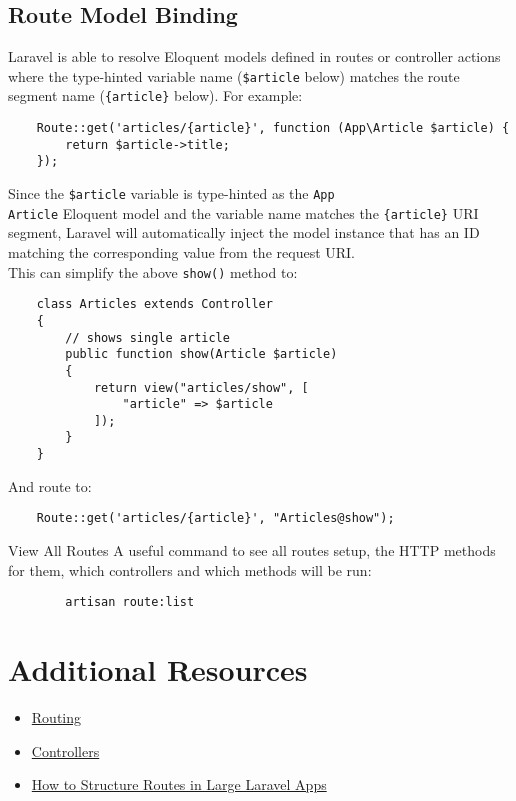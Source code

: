 \subsection{Route Model Binding}

Laravel is able to resolve Eloquent models defined in routes or controller actions where the type-hinted variable name (\texttt{\$article} below) matches the route segment name (\texttt{\{article\}} below). For example:

\begin{verbatim}
    Route::get('articles/{article}', function (App\Article $article) {
        return $article->title;
    });
\end{verbatim}

Since the \texttt{\$article} variable is type-hinted as the \texttt{App\\Article} Eloquent model and the variable name matches the \texttt{\{article\}} URI segment, Laravel will automatically inject the model instance that has an ID matching the corresponding value from the request URI.
\\

This can simplify the above \texttt{show()} method to:

\begin{verbatim}
    class Articles extends Controller
    {
        // shows single article
        public function show(Article $article)
        {
            return view("articles/show", [
                "article" => $article
            ]);
        }
    }
\end{verbatim}

And route to:

\begin{verbatim}
    Route::get('articles/{article}', "Articles@show");
\end{verbatim}

\begin{infobox}{View All Routes}
    A useful command to see all routes setup, the HTTP methods for them, which controllers and which methods will be run:

    \begin{verbatim}
        artisan route:list
    \end{verbatim}

\end{infobox}

\section{Additional Resources}

\begin{itemize}[leftmargin=*]
    \item \href{https://laravel.com/docs/master/routing}{Routing}
    \item \href{http://laravel.com/docs/master/controllers}{Controllers}
    \item \href{https://laraveldaily.com/how-to-structure-routes-in-large-laravel-projects/}{How to Structure Routes in Large Laravel Apps}
\end{itemize}

